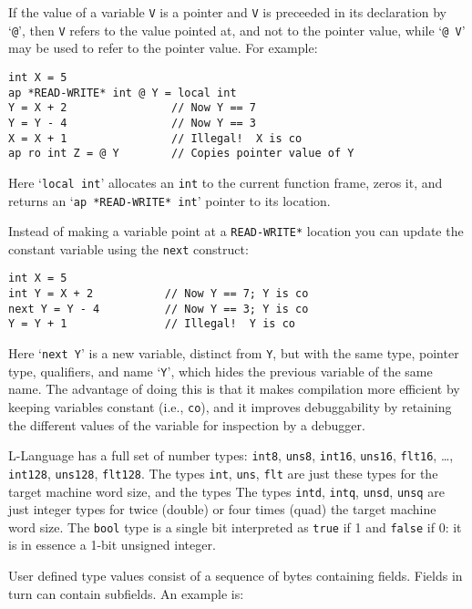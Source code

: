 \documentclass[12pt]{article}
\newenvironment{indpar}[1][0.3in]%
	{\begin{list}{}%
		     {\setlength{\itemsep}{0in}%
		      \setlength{\topsep}{0in}%
		      \setlength{\parsep}{1ex}%
		      \setlength{\labelwidth}{#1}%
		      \setlength{\leftmargin}{#1}%
		      \addtolength{\leftmargin}{\labelsep}}%
	 \item}%
	{\end{list}}
\begin{document}
If the value of a variable {\tt V} is a pointer and {\tt V} is
preceeded in its declaration by `{\tt @}', then {\tt V} refers
to the value pointed at, and not to the pointer value, while
`{\tt @ V}' may be used to refer to the pointer value.  For example:

\begin{indpar}\begin{verbatim}
int X = 5
ap *READ-WRITE* int @ Y = local int
Y = X + 2                // Now Y == 7
Y = Y - 4                // Now Y == 3
X = X + 1                // Illegal!  X is co
ap ro int Z = @ Y        // Copies pointer value of Y
\end{verbatim}\end{indpar}

Here `{\tt local int}' allocates an {\tt int} to the current
function frame, zeros it, and returns an `{\tt ap *READ-WRITE* int}'
pointer to its location.

Instead of making a variable point at a {\tt *READ-WRITE*} location you
can update the constant variable using the {\tt next} construct:
\begin{indpar}\begin{verbatim}
int X = 5
int Y = X + 2           // Now Y == 7; Y is co
next Y = Y - 4          // Now Y == 3; Y is co
Y = Y + 1               // Illegal!  Y is co
\end{verbatim}\end{indpar}
Here `{\tt next Y}' is a new variable, distinct from {\tt Y},
but with the same type, pointer type, qualifiers, and name `{\tt Y}',
which hides the previous variable of the same name.
The advantage of doing this is that it makes compilation more
efficient by keeping variables constant (i.e., {\tt co}), and
it improves debuggability by retaining the different values of
the variable for inspection by a debugger.

L-Language has a full set of number types:
{\tt int8}, {\tt uns8},
{\tt int16}, {\tt uns16}, {\tt flt16}, \ldots,
{\tt int128}, {\tt uns128}, {\tt flt128}.
The types {\tt int}, {\tt uns}, {\tt flt} are just these
types for the target machine word size, and the types
The types {\tt intd}, {\tt intq}, {\tt unsd}, {\tt unsq} are just integer
types for twice (double) or four times (quad) the target machine word size.
The {\tt bool} type is a single bit interpreted as {\tt true} if
1 and {\tt false} if 0: it is in essence a 1-bit unsigned integer.

User defined type values consist of a sequence of bytes containing fields.
Fields in turn can contain subfields.
An example is:
\end{document}
